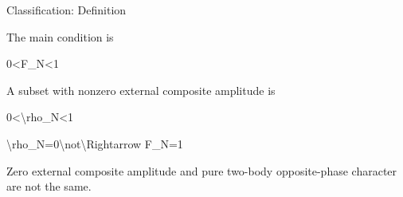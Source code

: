 \documentclass[
  a4paper]{article}
\newenvironment{Shaded}{}{}
\newcommand{\NormalTok}[1]{#1}
\begin{document}
Classification: Definition

The main condition is

\begin{Shaded}
\begin{Highlighting}[]
\NormalTok{0\textless{}F\_N\textless{}1}
\end{Highlighting}
\end{Shaded}

A subset with nonzero external composite amplitude is

\begin{Shaded}
\begin{Highlighting}[]
\NormalTok{0\textless{}\textbackslash{}rho\_N\textless{}1}
\end{Highlighting}
\end{Shaded}

\begin{Shaded}
\begin{Highlighting}[]
\NormalTok{\textbackslash{}rho\_N=0\textbackslash{}not\textbackslash{}Rightarrow F\_N=1}
\end{Highlighting}
\end{Shaded}

Zero external composite amplitude and pure two-body opposite-phase
character are not the same.
\end{document}
